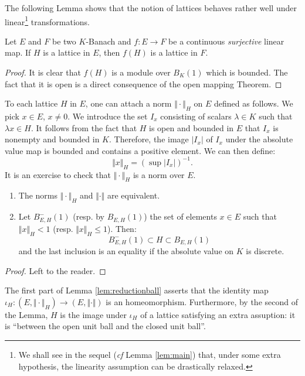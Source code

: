 \documentclass{amsart}
\begin{document}
The following Lemma shows that the notion of lattices behaves rather 
well under linear\footnote{We shall see in the sequel (\emph{cf} Lemma 
\ref{lem:main}) that, under some extra hypothesis, the linearity 
assumption can be drastically relaxed.} transformations.

\begin{lem}
\label{lem:morlat}
Let $E$ and $F$ be two $K$-Banach and $f : 
E \to F$ be a continuous \emph{surjective} linear map.
If $H$ is a lattice in $E$, then $f(H)$ is a lattice in $F$.
\end{lem}

\begin{proof}
It is clear that $f(H)$ is a module over $B_K(1)$ which is bounded.
The fact that it is open is a direct consequence of the open mapping
Theorem.
\end{proof}

To each lattice $H$ in $E$, one can attach a norm $\Vert \cdot \Vert_H$ 
on $E$ defined as follows. We pick $x \in E$, $x \neq 0$. We introduce
the set $I_x$ consisting of scalars $\lambda \in K$ such that $\lambda x 
\in H$. It follows from the fact that $H$ is open and bounded in $E$
that $I_x$ is nonempty and bounded in $K$. Therefore, the image $|I_x|$ 
of $I_x$ under the absolute value map is bounded and contains a positive
element. We can then define:
$$\Vert x \Vert_H = (\sup |I_x|)^{-1}.$$
It is an exercise to check that $\Vert \cdot \Vert_H$ is a norm over 
$E$.

\begin{lem} \label{lem:reductionball}
\begin{enumerate}
\item The norms $\Vert \cdot \Vert_H$ and $\Vert \cdot \Vert$ are 
equivalent.
\item Let $B^-_{E,H}(1)$ (resp. by $B_{E,H}(1)$) the set of elements $x 
\in E$ such that $\Vert x \Vert_H < 1$ (resp. $\Vert x \Vert_H \leq 1$).
Then:
$$B^-_{E,H}(1) \subset H \subset B_{E,H}(1)$$
and the last inclusion is an equality if the absolute value on $K$ is
discrete.
\end{enumerate}
\end{lem}

\begin{proof}
Left to the reader.
\end{proof}

The first part of Lemma \ref{lem:reductionball} asserts that the 
identity map $\iota_H : (E, \Vert \cdot \Vert_H) \to (E, \Vert \cdot 
\Vert)$ is an homeomorphism. Furthermore, by the second of the Lemma, 
$H$ is the image under $\iota_H$ of a lattice satisfying an extra 
assuption: it is ``between the open unit ball and the closed unit 
ball''.
\end{document}
